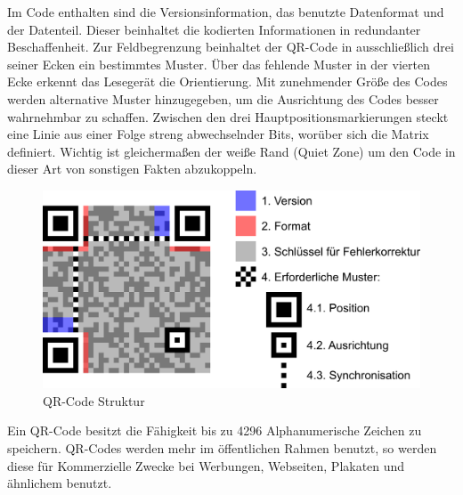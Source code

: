 \documentclass[12pt,					%
							 oneside,			%
							 a4paper,			%
							 halfparskip,		%
							 liststotoc,			%
							 bibtotoc,			%
							 fleqn,				%
							 pointlessnumbers]	%
							 {scrreprt}
\begin{document}
Im Code enthalten sind die Versionsinformation, das benutzte Datenformat und der Datenteil. Dieser beinhaltet die kodierten Informationen in redundanter Beschaffenheit. Zur Feldbegrenzung beinhaltet der QR-Code in ausschließlich drei seiner Ecken ein bestimmtes Muster. Über das fehlende Muster in der vierten Ecke erkennt das Lesegerät die Orientierung. Mit zunehmender Größe des Codes werden alternative Muster hinzugegeben, um die Ausrichtung des Codes besser wahrnehmbar zu schaffen. Zwischen den drei Hauptpositionsmarkierungen steckt eine Linie aus einer Folge streng abwechselnder Bits, worüber sich die Matrix definiert. Wichtig ist gleichermaßen der weiße Rand (Quiet Zone) um den Code in dieser Art von sonstigen Fakten abzukoppeln. 
\begin{figure}[ht]
\centering   
	 \includegraphics[scale=0.12]{pictures/QRCodeBild} 
 	\caption{QR-Code Struktur \cite{qrexapmle}}
\end{figure}

Ein QR-Code besitzt die Fähigkeit bis zu 4296 Alphanumerische Zeichen zu speichern. QR-Codes werden mehr im öffentlichen Rahmen benutzt, so werden diese für Kommerzielle Zwecke bei Werbungen, Webseiten, Plakaten und ähnlichem benutzt.
\end{document}
